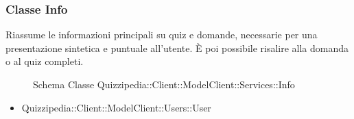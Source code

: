 \subsubsection{Classe Info}
Riassume le informazioni principali su quiz e domande, necessarie per una presentazione sintetica e puntuale all'utente. È poi possibile risalire alla domanda o al quiz completi.
\begin{figure}[H]
\centering
\noindent{}
\caption[Schema Classe Info]{Schema Classe Quizzipedia::Client::ModelClient::Services::Info}
\end{figure}
\begin{itemize}
\item Quizzipedia::Client::ModelClient::Users::User
\end{itemize}
